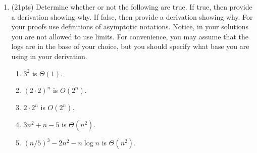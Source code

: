 \documentclass{article}
\begin{document}
\begin{enumerate}
\medskip
\item(21pts) Determine whether or not the following are true. If true, then provide a derivation showing why.
If false, then provide a derivation showing why. For your proofs use definitions of asymptotic notations. Notice, in your solutions you are not allowed to use limits.
For convenience, you may assume that the logs are in the base of your choice, but you should specify what base you are using in your derivation.
\begin{enumerate}
\item $3^2$ is $\Theta(1)$.
\item $(2 \cdot 2)^n$ is  $O(2^n)$.
\item $2 \cdot 2^n$ is $O(2^n)$.
\item $3n^2+n-5$ is $\Theta(n^2)$.
\item $(n/5)^3 - 2n^2 - n\log n$ is $\Theta(n^2)$.
\end{enumerate}
 
\end{enumerate}
\end{document}

